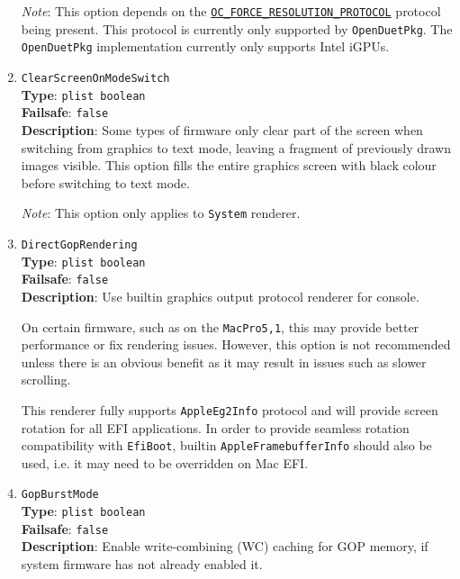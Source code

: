 \documentclass[]{article}
\begin{document}
\begin{enumerate}
  \emph{Note}: This option depends on the \href{https://github.com/acidanthera/OpenCorePkg/blob/master/Include/Acidanthera/Protocol/OcForceResolution.h}{\texttt{OC\_FORCE\_RESOLUTION\_PROTOCOL}}
  protocol being present. This protocol is currently only supported by \texttt{OpenDuetPkg}. The
  \texttt{OpenDuetPkg} implementation currently only supports Intel iGPUs.

\item
  \texttt{ClearScreenOnModeSwitch}\\
  \textbf{Type}: \texttt{plist\ boolean}\\
  \textbf{Failsafe}: \texttt{false}\\
  \textbf{Description}: Some types of firmware only clear part of the screen when switching
  from graphics to text mode, leaving a fragment of previously drawn images visible.
  This option fills the entire graphics screen with black colour before switching to
  text mode.

  \emph{Note}: This option only applies to \texttt{System} renderer.

\item
  \texttt{DirectGopRendering}\\
  \textbf{Type}: \texttt{plist\ boolean}\\
  \textbf{Failsafe}: \texttt{false}\\
  \textbf{Description}: Use builtin graphics output protocol renderer for console.

  On certain firmware, such as on the \texttt{MacPro5,1}, this may provide better
  performance or fix rendering issues. However, this option is not recommended unless
  there is an obvious benefit as it may result in issues such as slower scrolling.

  This renderer fully supports \texttt{AppleEg2Info} protocol and will provide
  screen rotation for all EFI applications. In order to provide seamless rotation
  compatibility with \texttt{EfiBoot}, builtin \texttt{AppleFramebufferInfo} should
  also be used, i.e. it may need to be overridden on Mac EFI.

\item
  \texttt{GopBurstMode}\\
  \textbf{Type}: \texttt{plist\ boolean}\\
  \textbf{Failsafe}: \texttt{false}\\
  \textbf{Description}: Enable write-combining (WC) caching for GOP memory, if system firmware has not
  already enabled it.


\end{enumerate}
\end{document}
